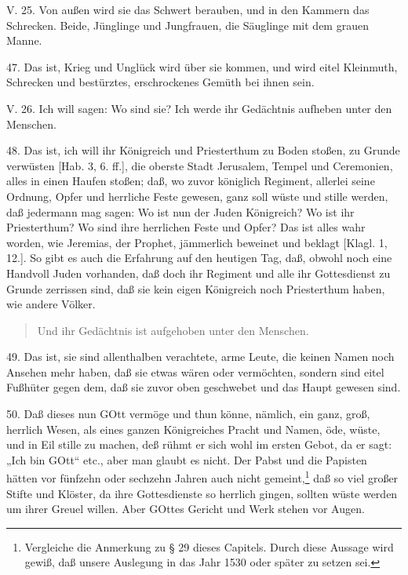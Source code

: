 \begin{schriftzitat}
V. 25. Von außen wird sie das Schwert berauben, und in den Kammern das Schrecken. Beide, Jünglinge und Jungfrauen, die Säuglinge mit dem grauen Manne.
\end{schriftzitat}

47. Das ist, Krieg und Unglück wird über sie kommen, und wird eitel Kleinmuth, Schrecken und bestürztes, erschrockenes Gemüth bei ihnen sein.

\begin{schriftzitat}
V. 26. Ich will sagen: Wo sind sie? Ich werde ihr Gedächtnis aufheben unter den Menschen.
\end{schriftzitat}

48. Das ist, ich will ihr Königreich und Priesterthum zu Boden stoßen, zu Grunde verwüsten [Hab. 3, 6. ff.], die oberste Stadt Jerusalem, Tempel und Ceremonien, alles in einen Haufen stoßen; daß, wo zuvor königlich Regiment, allerlei seine Ordnung, Opfer und herrliche Feste gewesen, ganz soll wüste und stille werden, daß jedermann mag sagen: Wo ist nun der Juden Königreich? Wo ist ihr Priesterthum? Wo sind ihre herrlichen Feste und Opfer? Das ist alles wahr worden, wie Jeremias, der Prophet, jämmerlich beweinet und beklagt [Klagl. 1, 12.]. So gibt es auch die Erfahrung auf den heutigen Tag, daß, obwohl noch eine Handvoll Juden vorhanden, daß doch ihr Regiment und alle ihr Gottesdienst zu Grunde zerrissen sind, daß sie kein eigen Königreich noch Priesterthum haben, wie andere Völker.

\begin{quote}
Und ihr Gedächtnis ist aufgehoben unter den Menschen.
\end{quote}

49. Das ist, sie sind allenthalben verachtete, arme Leute, die keinen Namen noch Ansehen mehr haben, daß sie etwas wären oder vermöchten, sondern sind eitel Fußhüter gegen dem, daß sie zuvor oben geschwebet und das Haupt gewesen sind.

50. Daß dieses nun GOtt vermöge und thun könne, nämlich, ein ganz, groß, herrlich Wesen, als eines ganzen Königreiches Pracht und Namen, öde, wüste, und in Eil stille zu machen, deß rühmt er sich wohl im ersten Gebot, da er sagt: „Ich bin GOtt“ etc., aber man glaubt es nicht. Der Pabst und die Papisten hätten vor fünfzehn oder sechzehn Jahren auch nicht gemeint,\footnote{Vergleiche die Anmerkung zu § 29 dieses Capitels. Durch diese Aussage wird gewiß, daß unsere Auslegung in das Jahr 1530 oder später zu setzen sei.} daß so viel großer Stifte und Klöster, da ihre Gottesdienste so herrlich gingen, sollten wüste werden um ihrer Greuel willen. Aber GOttes Gericht und Werk stehen vor Augen.

